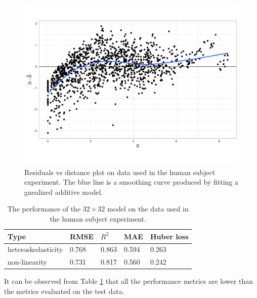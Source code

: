 \documentclass[]{interact}
\theoremstyle{plain}%
\theoremstyle{definition}
\theoremstyle{remark}
\begin{document}
\begin{figure}

{\centering \includegraphics[width=1\linewidth]{paper_files/figure-latex/unnamed-chunk-2-1} 

}

\caption{Residuals vs distance plot on data used in the human subject experiment. The blue line is a smoothing curve produced by fitting a gnealized additive model.}\label{fig:unnamed-chunk-2}
\end{figure}

\begin{table}

\caption{\label{tab:experiment-performance}The performance of the $32 \times 32$ model on the data used in the human subject experiment.}
\centering
\begin{tabular}[t]{lllll}
\toprule
Type & RMSE & $R^2$ & MAE & Huber loss\\
\midrule
heteroskedasticity & 0.768 & 0.863 & 0.594 & 0.263\\
non-linearity & 0.731 & 0.817 & 0.560 & 0.242\\
\bottomrule
\end{tabular}
\end{table}

It can be observed from Table \ref{tab:experiment-performance} that all
the performance metrics are lower than the metrics evaluated on the test
data.
\end{document}
